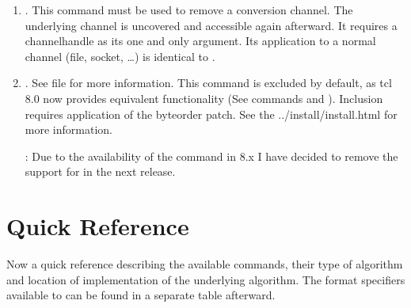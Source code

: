 \documentclass {report}
\def\installman{\htmladdnormallink {installation manual} {../install/install.html}}
\begin{document}
\begin	{enumerate}
\item	{}. This command must be used to remove a
	conversion channel. The underlying channel is uncovered and
	accessible again afterward. It requires a channelhandle as its
	one and only argument. Its application to a normal channel
	(file, socket, \dots {}) is identical to .

\item	{}. See file 
	for more information. This command is excluded by default, as
	tcl 8.0 now provides equivalent functionality (See commands
	 and ). Inclusion requires
	application of the byteorder patch. See the \installman{} for
	more information.

	: Due to the availability of the 
	command in \tcl{} 8.x I have decided to remove the support for
	 in the next release.
\end	{enumerate}


\section {Quick Reference}
Now a quick reference describing the available commands, their type of
algorithm and location of implementation of the underlying
algorithm. The format specifiers available to  can be
found in a separate table afterward.
\end{document}
